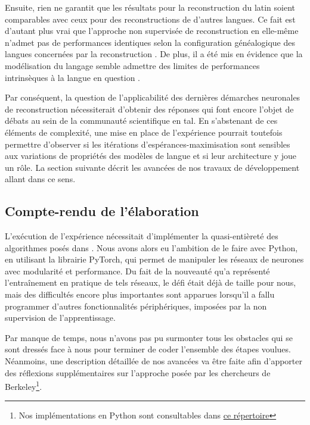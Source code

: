 \documentclass[12pt, twoside]{report}
\begin{document}
Ensuite, rien ne garantit que les résultats pour la reconstruction du latin soient comparables avec ceux pour des reconstructions de d'autres langues. Ce fait est d'autant plus vrai que l'approche non supervisée de reconstruction en elle-même n'admet pas de performances identiques selon la configuration généalogique des langues concernées par la reconstruction \autocite[section :  Limitations]{he2022neural}. De plus, il a été mis en évidence que la modélisation du langage semble admettre des limites de performances intrinsèques à la langue en question \autocite{cotterell-etal-2018-languages}.

\vspace{12pt}
Par conséquent, la question de l'applicabilité des dernières démarches neuronales de reconstruction nécessiterait d'obtenir des réponses qui font encore l'objet de débats au sein de la communauté scientifique en \Gls{tal}. En s'abstenant de ces éléments de complexité, une mise en place de l'expérience pourrait toutefois permettre d'observer si les itérations d'espérances-maximisation sont sensibles aux variations de propriétés des modèles de langue et si leur architecture y joue un rôle. La section suivante décrit les avancées de nos travaux de développement allant dans ce sens.

\subsection{Compte-rendu de l'élaboration}

L'exécution de l'expérience nécessitait d'implémenter la quasi-entièreté des algorithmes posés dans \cite{he2022neural}. Nous avons alors eu l'ambition de le faire avec Python, en utilisant la librairie PyTorch, qui permet de manipuler les réseaux de neurones avec modularité et performance. Du fait de la nouveauté qu'a représenté l'entraînement en pratique de tels réseaux, le défi était déjà de taille pour nous, mais des difficultés encore plus importantes sont apparues lorsqu'il a fallu programmer d'autres fonctionnalités périphériques, imposées par la non supervision de l'apprentissage.

Par manque de temps, nous n'avons pas pu surmonter tous les obstacles qui se sont dressés face à nous pour terminer de coder l'ensemble des étapes voulues. Néanmoins, une description détaillée de nos avancées va être faite afin d'apporter des réflexions supplémentaires sur l'approche posée par les chercheurs de Berkeley\footnote{Nos implémentations en Python sont consultables dans \href{https://github.com/Convolutio/IA_languesAnciennes/tree/master/Code/Unsupervised_reconstruction}{ce répertoire}}.
\end{document}
